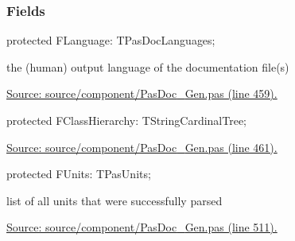 \documentclass{report}
\newif\ifpdf
\begin{document}
\subsubsection*{\large{\textbf{Fields}}\normalsize\hspace{1ex}\hfill}
\begin{list}{}{
\setlength{\itemindent}{0cm}
\setlength{\listparindent}{0cm}
\setlength{\leftmargin}{\evensidemargin}
\addtolength{\leftmargin}{\tmplength}
\settowidth{\labelsep}{X}
\addtolength{\leftmargin}{\labelsep}
\setlength{\labelwidth}{\tmplength}
}
\label{PasDoc_Gen.TDocGenerator-FLanguage}
\item[\textbf{FLanguage}\hfill]
\ifpdf
\begin{flushleft}
\fi
\begin{ttfamily}
protected FLanguage: TPasDocLanguages;\end{ttfamily}

\ifpdf
\end{flushleft}
\fi


\par the (human) output language of the documentation file(s)\par
\href{https://github.com/pasdoc/pasdoc/blob/master/source/component/PasDoc_Gen.pas#L459}{Source: source/component/PasDoc{\_}Gen.pas (line 459).}\label{PasDoc_Gen.TDocGenerator-FClassHierarchy}
\item[\textbf{FClassHierarchy}\hfill]
\ifpdf
\begin{flushleft}
\fi
\begin{ttfamily}
protected FClassHierarchy: TStringCardinalTree;\end{ttfamily}

\ifpdf
\end{flushleft}
\fi


\par  \par
\href{https://github.com/pasdoc/pasdoc/blob/master/source/component/PasDoc_Gen.pas#L461}{Source: source/component/PasDoc{\_}Gen.pas (line 461).}\label{PasDoc_Gen.TDocGenerator-FUnits}
\item[\textbf{FUnits}\hfill]
\ifpdf
\begin{flushleft}
\fi
\begin{ttfamily}
protected FUnits: TPasUnits;\end{ttfamily}

\ifpdf
\end{flushleft}
\fi


\par list of all units that were successfully parsed\par
\href{https://github.com/pasdoc/pasdoc/blob/master/source/component/PasDoc_Gen.pas#L511}{Source: source/component/PasDoc{\_}Gen.pas (line 511).}\end{list}
\end{document}
